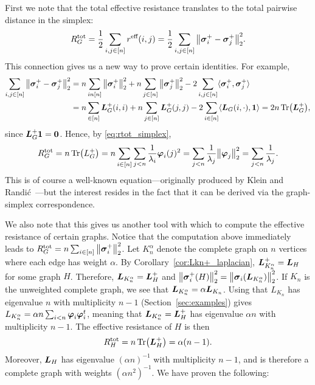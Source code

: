 First  we  note that the total effective resistance translates to the total pairwise distance in the simplex: 
\begin{align}
R^{\textnormal{tot}}_G = \frac{1}{2}\sum_{i,j\in[n]} r^{\text{eff}}(i,j) = \frac{1}{2}\sum_{i,j\in[n]}\norm{\vb*{\sigma}_i^+-\vb*{\sigma}_j^+}_2^2. \label{eq:rtot_simplex}
\end{align}
This connection gives us a new way to prove certain identities. For example, 
\begin{align*}
\sum_{i,j\in[n]}\norm{\vb*{\sigma}_i^+-\vb*{\sigma}_j^+}_2^2 &= n\sum_{in[n]}\norm{\vb*{\sigma}_i^+}_2^2 + n\sum_{j\in[n]}\norm{\vb*{\sigma}_j^+}_2^2 - 2\sum_{i,j\in[n]}\langle\vb*{\sigma}_i^+,\vb*{\sigma}_j^+\rangle \\ 
&= n\sum_{\in[n]}\vb*{L}_G^+(i,i) + n\sum_{j\in[n]}\vb*{L}_G^+(j,j) - 2\sum_{i\in[n]}\langle \vb*{L}_G(i,\cdot),\vb{1}\rangle = 2n\Tr(\vb*{L}_G^+),
\end{align*}
since $\vb*{L}_G^+\vb{1}=\vb{0}$. 
Hence, by \eqref{eq:rtot_simplex},
\begin{equation*}
R^{\textnormal{tot}}_G=n\Tr(L_G^+) = n\sum_{i\in[n]}\sum_{j<n} \frac{1}{\lambda_i}\vb*{\varphi}_i(j)^2 =\sum_{j<n}\frac{1}{\lambda_j}\norm{\vb*{\varphi}_j}_2^2 = \sum_{j<n}\frac{1}{\lambda_j}.
\end{equation*}
This is of course a well-known equation---originally produced by Klein  and Randi\'{c}~\cite{klein1993resistance}---but the interest resides in the fact that it can be derived via the graph-simplex correspondence.  

We also note that this gives us another tool with  which to compute the effective resistance of certain graphs.  Notice that the computation above immediately leads to $R^{\textnormal{tot}}_G = n\sum_{i\in[n]}\norm{\vb*{\sigma}_i^+}_2^2$. Let $K_n^\alpha$ denote the complete graph on $n$ vertices where each edge has weight $\alpha$. By Corollary~\ref{cor:Lkn+_laplacian}, $\vb*{L}_{K_n^\alpha}^+=\vb*{L}_H$ for some graph $H$. Therefore, $\vb*{L}_{K_n^\alpha}=\vb*{L}_H^+$ and  $\norm{\vb*{\sigma}_i^+(H)}_2^2 = \norm{\vb*{\sigma}_i(\vb*{L}_{K_n^\alpha})}_2^2$.  If $K_n$ is the unweighted complete graph, we see that $\vb*{L}_{K_n^\alpha}=\alpha\vb*{L}_{K_n}$. Using  that $L_{K_n}$ has eigenvalue $n$ with multiplicity $n-1$  (Section~\ref{sec:examples}) gives $L_{K_n^\alpha}=\alpha n\sum_{i<n}\vb*{\varphi}_i\vb*{\varphi}_i^t$, meaning that $\vb*{L}_{K_n^\alpha}=\vb*{L}_H^+$ has eigenvalue $\alpha n$ with multiplicity $n-1$. The effective resistance of $H$ is then 
\begin{equation*}
R^{\textnormal{tot}}_H = n\Tr(\vb*{L}_H^+) = \alpha(n-1). 
\end{equation*}
Moreover, $\vb*{L}_H$ has eigenvalue $(\alpha n)^{-1}$ with multiplicity $n-1$, and  is therefore a complete graph with weights $(\alpha n^2)^{-1}$. We have proven the  following:  

